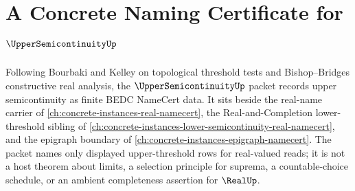\chapter{A Concrete Naming Certificate for $\UpperSemicontinuityUp$}
\label{ch:concrete-instances-upper-semicontinuity-namecert}

Following Bourbaki and Kelley on topological threshold tests and Bishop--Bridges constructive real analysis, the $\UpperSemicontinuityUp$ packet records upper semicontinuity as finite BEDC NameCert data. It sits beside the real-name carrier of \autoref{ch:concrete-instances-real-namecert}, the Real-and-Completion lower-threshold sibling of \autoref{ch:concrete-instances-lower-semicontinuity-real-namecert}, and the epigraph boundary of \autoref{ch:concrete-instances-epigraph-namecert}. The packet names only displayed upper-threshold rows for real-valued reads; it is not a host theorem about limits, a selection principle for suprema, a countable-choice schedule, or an ambient completeness assertion for $\RealUp$.

